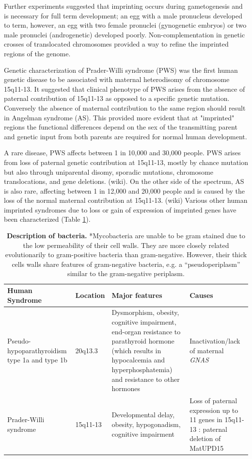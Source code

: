 Further experiments suggested that imprinting occurs during gametogenesis and is necessary for full term development; an egg with a male pronucleus developed to term, however, an egg with two female pronuclei (gynogenetic embryos) or two male pronuclei (androgenetic) developed poorly\cite{Surani1984,McGrath:1984ky}. Non-complementation in genetic crosses of translocated chromosomes provided a way to refine the imprinted regions of the genome\cite{Cattanach:1985hu}. 

Genetic characterization of Prader-Willi syndrome (PWS) was the first human genetic disease to be associated with maternal heterodisomy of chromosome 15q11-13\cite{Nicholls:vh}. It suggested that  clinical phenotype of PWS arises from the absence of paternal contribution of 15q11-13 as opposed to a specific genetic mutation. Conversely the absence of maternal contribution to the same region should result in Angelman syndrome (AS)\cite{Nicholls:vh,Reik:1989el}. This provided more evident that at "imprinted" regions the functional differences depend on the sex of the transmitting parent and genetic input from both parents are required for normal human development\cite{Nicholls:vh}.

A rare disease, PWS affects between 1 in 10,000 and 30,000 people. PWS arises from loss of paternal genetic contribution at 15q11-13, mostly by chance mutation but also through uniparental disomy, sporadic mutations, chromosome translocations, and gene deletions. (wiki). On the other side of the spectrum, AS is also rare, affecting between 1 in 12,000 and 20,000 people and is caused by the loss of the normal maternal contribution at 15q11-13. (wiki) Various other human imprinted syndromes due to loss or gain of expression of imprinted genes have been characterized (Table \ref{tab:imprinteddisease}). \cite{Peters2014}


\begin{table}
\centering
\begin{tabular}{@{}llll@{}}
\toprule Human Syndrome & Location & Major features & Causes \\ \midrule 
Pseudo-hypoparathyroidism type 1a and type 1b  & 20q13.3 & Dysmorphism, obesity, cognitive impairment, end-organ resistance to parathyroid hormone (which results in hypocalcemia and hyperphosphatemia) and resistance to other hormones & Inactivation/lack of maternal \emph{GNAS} \\ 
Prader-Willi syndrome & 15q11-13 & Developmental delay, obesity, hypogonadism, cognitive impairment & Loss of paternal expression up to 11 genes in 15q11-13 : paternal deletion of MatUPD15\\  \bottomrule
\end{tabular}
\caption[Description of bacteria.]{\textbf{Description of bacteria.}
  *Mycobacteria are unable to be gram stained due to the low
  permeability of their cell walls. They are more closely related
  evolutionarily to gram-positive bacteria than
  gram-negative. However, their thick cells walls share features of
  gram-negative bacteria, e.g. a ``pseudoperiplasm'' similar to the
  gram-negative periplasm.}
\label{tab:imprinteddisease}
\end{table}



